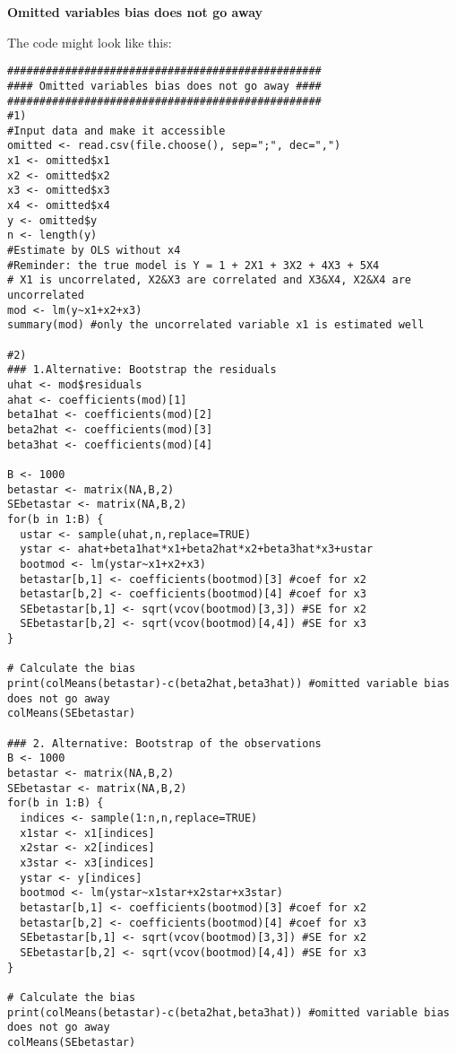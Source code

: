 \documentclass{article}
\begin{document}
\begin{solution}
\textbf{Omitted variables bias does not go away }

The code might look like this:
\begin{verbatim}
#################################################
#### Omitted variables bias does not go away ####
#################################################
#1)
#Input data and make it accessible
omitted <- read.csv(file.choose(), sep=";", dec=",")
x1 <- omitted$x1
x2 <- omitted$x2
x3 <- omitted$x3
x4 <- omitted$x4
y <- omitted$y
n <- length(y)
#Estimate by OLS without x4
#Reminder: the true model is Y = 1 + 2X1 + 3X2 + 4X3 + 5X4
# X1 is uncorrelated, X2&X3 are correlated and X3&X4, X2&X4 are uncorrelated
mod <- lm(y~x1+x2+x3)
summary(mod) #only the uncorrelated variable x1 is estimated well

#2)
### 1.Alternative: Bootstrap the residuals
uhat <- mod$residuals
ahat <- coefficients(mod)[1]
beta1hat <- coefficients(mod)[2]
beta2hat <- coefficients(mod)[3]
beta3hat <- coefficients(mod)[4]

B <- 1000
betastar <- matrix(NA,B,2)
SEbetastar <- matrix(NA,B,2)
for(b in 1:B) {
  ustar <- sample(uhat,n,replace=TRUE)
  ystar <- ahat+beta1hat*x1+beta2hat*x2+beta3hat*x3+ustar
  bootmod <- lm(ystar~x1+x2+x3)
  betastar[b,1] <- coefficients(bootmod)[3] #coef for x2
  betastar[b,2] <- coefficients(bootmod)[4] #coef for x3
  SEbetastar[b,1] <- sqrt(vcov(bootmod)[3,3]) #SE for x2
  SEbetastar[b,2] <- sqrt(vcov(bootmod)[4,4]) #SE for x3
}

# Calculate the bias
print(colMeans(betastar)-c(beta2hat,beta3hat)) #omitted variable bias does not go away
colMeans(SEbetastar)

### 2. Alternative: Bootstrap of the observations
B <- 1000
betastar <- matrix(NA,B,2)
SEbetastar <- matrix(NA,B,2)
for(b in 1:B) {
  indices <- sample(1:n,n,replace=TRUE)
  x1star <- x1[indices]
  x2star <- x2[indices]
  x3star <- x3[indices]
  ystar <- y[indices]
  bootmod <- lm(ystar~x1star+x2star+x3star)
  betastar[b,1] <- coefficients(bootmod)[3] #coef for x2
  betastar[b,2] <- coefficients(bootmod)[4] #coef for x3
  SEbetastar[b,1] <- sqrt(vcov(bootmod)[3,3]) #SE for x2
  SEbetastar[b,2] <- sqrt(vcov(bootmod)[4,4]) #SE for x3
}

# Calculate the bias
print(colMeans(betastar)-c(beta2hat,beta3hat)) #omitted variable bias does not go away
colMeans(SEbetastar)
\end{verbatim}
\end{solution}
\end{document}
